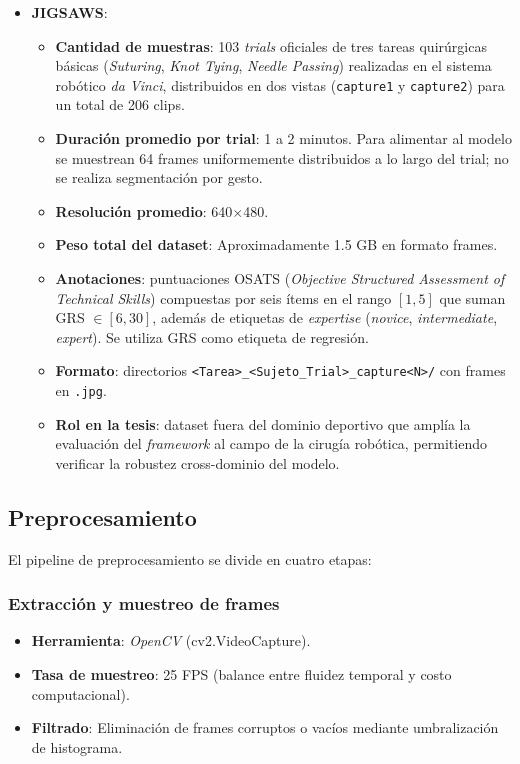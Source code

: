 \begin{itemize}
    \item \textbf{JIGSAWS}:
        \begin{itemize}
            \item \textbf{Cantidad de muestras}: 103 \textit{trials} oficiales de tres tareas quirúrgicas básicas (\textit{Suturing}, \textit{Knot Tying}, \textit{Needle Passing}) realizadas en el sistema robótico \textit{da Vinci}, distribuidos en dos vistas (\texttt{capture1} y \texttt{capture2}) para un total de 206 clips.
            \item \textbf{Duración promedio por trial}: 1 a 2 minutos. Para alimentar al modelo se muestrean 64 frames uniformemente distribuidos a lo largo del trial; no se realiza segmentación por gesto.
            \item \textbf{Resolución promedio}: 640$\times$480.
            \item \textbf{Peso total del dataset}: Aproximadamente 1.5 GB en formato frames.
            \item \textbf{Anotaciones}: puntuaciones OSATS (\textit{Objective Structured Assessment of Technical Skills}) compuestas por seis ítems en el rango $[1,5]$ que suman GRS $\in [6,30]$, además de etiquetas de \textit{expertise} (\textit{novice}, \textit{intermediate}, \textit{expert}). Se utiliza GRS como etiqueta de regresión.
            \item \textbf{Formato}: directorios \texttt{<Tarea>\_<Sujeto\_Trial>\_capture<N>/} con frames en \texttt{.jpg}.
            \item \textbf{Rol en la tesis}: dataset fuera del dominio deportivo que amplía la evaluación del \textit{framework} al campo de la cirugía robótica, permitiendo verificar la robustez cross-dominio del modelo.
        \end{itemize}
\end{itemize}


\subsection{Preprocesamiento}
El pipeline de preprocesamiento se divide en cuatro etapas:

\subsubsection{Extracción y muestreo de frames}
\begin{itemize}
    \item \textbf{Herramienta}: \textit{OpenCV} (cv2.VideoCapture).
    \item \textbf{Tasa de muestreo}: 25 FPS (balance entre fluidez temporal y costo computacional).
    \item \textbf{Filtrado}: Eliminación de frames corruptos o vacíos mediante umbralización de histograma.
\end{itemize}

